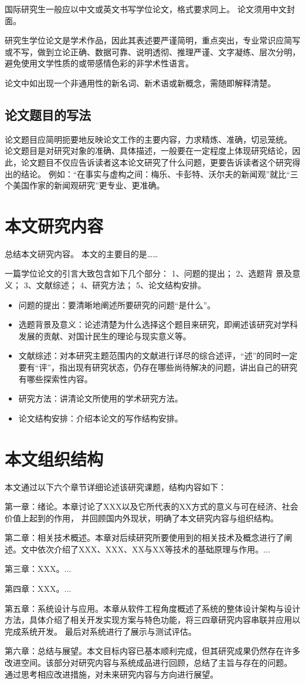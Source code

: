 国际研究生一般应以中文或英文书写学位论文，格式要求同上。
论文须用中文封面。

研究生学位论文是学术作品，因此其表述要严谨简明，重点突出，专业常识应简写或不写，做到立论正确、数据可靠、说明透彻、推理严谨、文字凝练、层次分明，避免使用文学性质的或带感情色彩的非学术性语言。

论文中如出现一个非通用性的新名词、新术语或新概念，需随即解释清楚。

\subsection{论文题目的写法}

论文题目应简明扼要地反映论文工作的主要内容，力求精炼、准确，切忌笼统。
论文题目是对研究对象的准确、具体描述，一般要在一定程度上体现研究结论，因此，论文题目不仅应告诉读者这本论文研究了什么问题，更要告诉读者这个研究得出的结论。
例如：“在事实与虚构之间：梅乐、卡彭特、沃尔夫的新闻观”就比“三个美国作家的新闻观研究”更专业、更准确。

\section{本文研究内容}

总结本文研究内容。
本文的主要目的是……

一篇学位论文的引言大致包含如下几个部分：
1、问题的提出；
2、选题背 景及意义；
3、文献综述；
4、研究方法；
5、论文结构安排。
\begin{itemize}
  \item 问题的提出：要清晰地阐述所要研究的问题“是什么”。
  \item 选题背景及意义：论述清楚为什么选择这个题目来研究，即阐述该研究对学科发展的贡献、对国计民生的理论与现实意义等。
  \item 文献综述：对本研究主题范围内的文献进行详尽的综合述评，“述”的同时一定要有“评”，指出现有研究状态，仍存在哪些尚待解决的问题，讲出自己的研究有哪些探索性内容。
  \item 研究方法：讲清论文所使用的学术研究方法。
  \item 论文结构安排：介绍本论文的写作结构安排。
\end{itemize}

\section{本文组织结构}

本文通过以下六个章节详细论述该研究课题，结构内容如下：

第一章：绪论。本章讨论了XXX以及它所代表的XX方式的意义与可在经济、社会价值上起到的作用，
并回顾国内外现状，明确了本文研究内容与组织结构。

第二章：相关技术概述。本章对后续研究所要使用到的相关技术及概念进行了阐述。文中依次介绍了XXX、XXX、XX与XX等技术的基础原理与作用。...

第三章：XXX。...

第四章：XXX。...

第五章：系统设计与应用。本章从软件工程角度概述了系统的整体设计架构与设计方法，具体介绍了相关开发实现方案与特色功能，将三四章研究内容串联并应用以完成系统开发。
最后对系统进行了展示与测试评估。

第六章：总结与展望。本文目标内容已基本顺利完成，但其研究成果仍然存在许多改进空间。该部分对研究内容与系统成品进行回顾，总结了主旨与存在的问题。
通过思考相应改进措施，对未来研究内容与方向进行展望。
